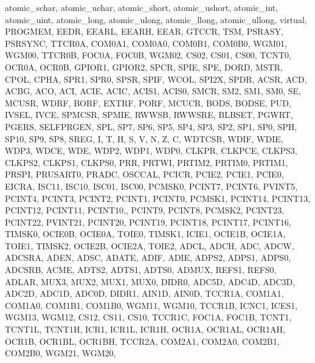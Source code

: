 {{                atomic_schar, atomic_uchar, atomic_short, atomic_ushort, atomic_int, 
                atomic_uint, atomic_long, atomic_ulong, atomic_llong, atomic_ullong, 
                virtual, PROGMEM,
                EEDR, EEARL, EEARH, EEAR,
                GTCCR, TSM, PSRASY, PSRSYNC,
                TTCR0A, COM0A1, COM0A0, COM0B1, COM0B0, WGM01, WGM00,
                TTCR0B, FOC0A, FOC0B, WGM02, CS02, CS01, CS00,
                TCNT0, OCR0A, OCR0B,
                GPIOR1, GPIOR2,
                SPCR, SPIE, SPE, DORD, MSTR, CPOL, CPHA, SPR1, SPR0,
                SPSR, SPIF, WCOL, SPI2X,
                SPDR,
                ACSR, ACD, ACBG, ACO, ACI, ACIE, ACIC, ACIS1, ACIS0,
                SMCR, SM2, SM1, SM0, SE,
                MCUSR, WDRF, BORF, EXTRF, PORF,
                MCUCR, BODS, BODSE, PUD, IVSEL, IVCE,
                SPMCSR, SPMIE, RWWSB, RWWSRE, BLBSET, PGWRT, PGERS, SELFPRGEN,
                SPL, SP7, SP6, SP5, SP4, SP3, SP2, SP1, SP0, 
                SPH, SP10, SP9, SP8,
                SREG, I, T, H, S, V, N, Z, C,
                WDTCSR, WDIF, WDIE, WDP3, WDCE, WDE, WDP2, WDP1, WDP0,
                CLKPR, CLKPCE, CLKPS3, CLKPS2, CLKPS1, CLKPS0,
                PRR, PRTWI, PRTIM2, PRTIM0, PRTIM1, PRSPI, PRUSART0, PRADC,
                OSCCAL,
                PCICR, PCIE2, PCIE1, PCIE0,
                EICRA, ISC11, ISC10, ISC01, ISC00,
                PCMSK0, PCINT7, PCINT6, PVINT5, PCINT4, PCINT3, PCINT2, PCINT1, PCINT0,
                PCMSK1, PCINT14, PCINT13, PCINT12, PCINT11, PCINT10,, PCINT9, PCINT8,
                PCMSK2, PCINT23, PCINT22, PVINT21, PCINT20, PCINT19, PCINT18, PCINT17, PCINT16,
                TIMSK0, OCIE0B, OCIE0A, TOIE0,
                TIMSK1, ICIE1, OCIE1B, OCIE1A, TOIE1,
                TIMSK2, OCIE2B, OCIE2A, TOIE2,
                ADCL, ADCH, ADC, ADCW,
                ADCSRA, ADEN, ADSC, ADATE, ADIF, ADIE, ADPS2, ADPS1, ADPS0,
                ADCSRB, ACME, ADTS2, ADTS1, ADTS0,
                ADMUX, REFS1, REFS0, ADLAR, MUX3, MUX2, MUX1, MUX0,
                DIDR0, ADC5D, ADC4D, ADC3D, ADC2D, ADC1D, ADC0D,
                DIDR1, AIN1D, AIN0D,
                TCCR1A, COM1A1, COM1A0, COM1B1, COM1B0, WGM11, WGM10,
                TCCR1B, ICNC1, ICES1, WGM13, WGM12, CS12, CS11, CS10,
                TCCR1C, FOC1A, FOC1B,
                TCNT1, TCNT1L, TCNT1H,
                ICR1, ICR1L, ICR1H,
                OCR1A, OCR1AL, OCR1AH,
                OCR1B, OCR1BL, OCR1BH,
                TCCR2A, COM2A1, COM2A0, COM2B1, COM2B0, WGM21, WGM20,
}}

